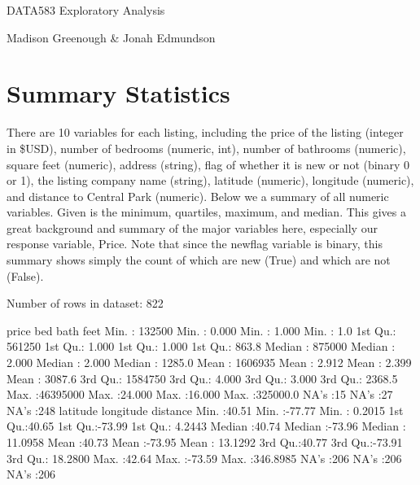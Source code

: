 \documentclass[11pt, a4paper]{article}
\begin{document}


\begin{center}
\LARGE{DATA583 Exploratory Analysis}
\par
\vspace{1.0pc}
\par
\large{Madison Greenough \& Jonah Edmundson}
\end{center}


\vspace{0.917 pc} %



\section{Summary Statistics}

There are 10 variables for each listing, including the price of the listing (integer in \$USD), number of bedrooms (numeric, int), number of bathrooms (numeric), square feet (numeric), address (string), flag of whether it is new or not (binary 0 or 1), the listing company name (string), latitude (numeric), longitude (numeric), and distance to Central Park (numeric). Below we a summary of all numeric variables. Given is the minimum, quartiles, maximum, and median. This gives a great background and summary of the major variables here, especially our response variable, Price. Note that since the newflag variable is binary, this summary shows simply the count of which are new (True) and which are not (False).

\begin{Schunk}
\begin{Soutput}
Number of rows in dataset: 822
\end{Soutput}
\begin{Soutput}
     price               bed              bath             feet         
 Min.   :  132500   Min.   : 0.000   Min.   : 1.000   Min.   :     1.0  
 1st Qu.:  561250   1st Qu.: 1.000   1st Qu.: 1.000   1st Qu.:   863.8  
 Median :  875000   Median : 2.000   Median : 2.000   Median :  1285.0  
 Mean   : 1606935   Mean   : 2.912   Mean   : 2.399   Mean   :  3087.6  
 3rd Qu.: 1584750   3rd Qu.: 4.000   3rd Qu.: 3.000   3rd Qu.:  2368.5  
 Max.   :46395000   Max.   :24.000   Max.   :16.000   Max.   :325000.0  
                    NA's   :15       NA's   :27       NA's   :248       
    latitude       longitude         distance       
 Min.   :40.51   Min.   :-77.77   Min.   :  0.2015  
 1st Qu.:40.65   1st Qu.:-73.99   1st Qu.:  4.2443  
 Median :40.74   Median :-73.96   Median : 11.0958  
 Mean   :40.73   Mean   :-73.95   Mean   : 13.1292  
 3rd Qu.:40.77   3rd Qu.:-73.91   3rd Qu.: 18.2800  
 Max.   :42.64   Max.   :-73.59   Max.   :346.8985  
 NA's   :206     NA's   :206      NA's   :206       
\end{Soutput}
\end{Schunk}
\end{document}
